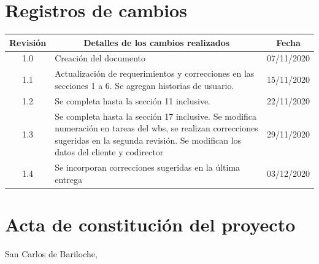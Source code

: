 \documentclass[11pt]{charter}
\begin{document}
\maketitle
\thispagestyle{empty}
\pagebreak


\thispagestyle{empty}
{\setlength{\parskip}{0pt}
\tableofcontents{}
}
\pagebreak


\section{Registros de cambios}
\label{sec:registro}


\begin{table}[ht]
\label{tab:registro}
\centering
\begin{tabularx}{\linewidth}{@{}|c|X|c|@{}}
\hline
\rowcolor[HTML]{C0C0C0} 
Revisión & \multicolumn{1}{c|}{\cellcolor[HTML]{C0C0C0}Detalles de los cambios realizados} & Fecha      \\ \hline
1.0      & Creación del documento                                          & 07/11/2020 \\ \hline
1.1      & Actualización de requerimientos y correcciones en las secciones 1 a 6. Se agregan historias de usuario. & 15/11/2020 \\ \hline
1.2      & Se completa hasta la sección 11 inclusive.                      & 22/11/2020 \\ \hline
1.3      & Se completa hasta la sección 17 inclusive. Se modifica numeración en tareas del wbs, se realizan correcciones sugeridas en la segunda revisión. Se modifican los datos del cliente y codirector                & 29/11/2020 \\ \hline
1.4      & Se incorporan correcciones sugeridas en la última entrega    & 03/12/2020 \\ \hline

\end{tabularx}
\end{table}

\pagebreak



\section{Acta de constitución del proyecto}
\label{sec:acta}

\begin{flushright}
San Carlos de Bariloche, \fechaInicioName
\end{flushright}

\vspace{2cm}
\end{document}
